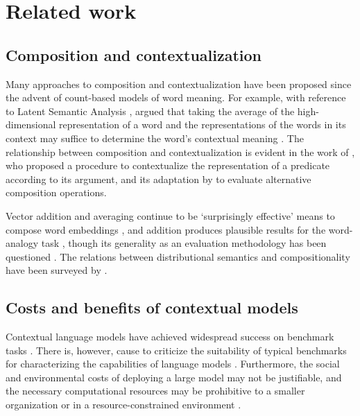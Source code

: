 \section{Related work}
\label{sec:related-work}

\subsection{Composition and contextualization}

Many approaches to composition and contextualization have been proposed since the
advent of count-based models of word meaning.
For example, with reference to Latent Semantic Analysis \parencites{Deerwester1990},
\citeauthor{Landauer1997} argued that taking the average of the high-dimensional
representation of a word and the representations of the words in its context may
suffice to determine the word's contextual meaning \parencites*[229-230]{Landauer1997}.
The relationship between composition and contextualization is evident in the work of
\textcites{Kintsch2001}, who proposed a procedure to contextualize the representation
of a predicate according to its argument, and its adaptation by
\textcites{Mitchell2008} to evaluate alternative composition operations.

Vector addition and averaging continue to be `surprisingly effective' means to compose
word embeddings \parencites[10]{Boleda2020}, and addition produces plausible results
for the word-analogy task \parencites[9]{Mikolov2013}[7]{Mikolov2013a}, though its
generality as an evaluation methodology has been questioned
\parencites[1300]{Lenci2022}.
The relations between distributional semantics and compositionality have been surveyed
by \textcites{Erk2012}{Clark2015}{Boleda2016}.

\subsection{Costs and benefits of contextual models}

Contextual language models have achieved widespread success on benchmark tasks
\parencites[22-27]{Bommasani2022}.
There is, however, cause to criticize the suitability of typical benchmarks for
characterizing the capabilities of language models \parencites[5-6]{Srivastava2023}.
Furthermore, the social and environmental costs of deploying a large model may not be
justifiable, and the necessary computational resources may be prohibitive to a smaller
organization or in a resource-constrained environment
\parencites[142-145,154]{Bommasani2022}.

